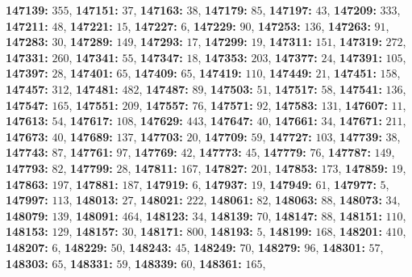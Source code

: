 \textsf{\bfseries 147139:} $355$, \textsf{\bfseries 147151:} $37$, \textsf{\bfseries 147163:} $38$, \textsf{\bfseries 147179:} $85$, \textsf{\bfseries 147197:} $43$, \textsf{\bfseries 147209:} $333$, \textsf{\bfseries 147211:} $48$, \textsf{\bfseries 147221:} $15$, \textsf{\bfseries 147227:} $6$, \textsf{\bfseries 147229:} $90$, \textsf{\bfseries 147253:} $136$, \textsf{\bfseries 147263:} $91$, \textsf{\bfseries 147283:} $30$, \textsf{\bfseries 147289:} $149$, \textsf{\bfseries 147293:} $17$, \textsf{\bfseries 147299:} $19$, \textsf{\bfseries 147311:} $151$, \textsf{\bfseries 147319:} $272$, \textsf{\bfseries 147331:} $260$, \textsf{\bfseries 147341:} $55$, \textsf{\bfseries 147347:} $18$, \textsf{\bfseries 147353:} $203$, \textsf{\bfseries 147377:} $24$, \textsf{\bfseries 147391:} $105$, \textsf{\bfseries 147397:} $28$, \textsf{\bfseries 147401:} $65$, \textsf{\bfseries 147409:} $65$, \textsf{\bfseries 147419:} $110$, \textsf{\bfseries 147449:} $21$, \textsf{\bfseries 147451:} $158$, \textsf{\bfseries 147457:} $312$, \textsf{\bfseries 147481:} $482$, \textsf{\bfseries 147487:} $89$, \textsf{\bfseries 147503:} $51$, \textsf{\bfseries 147517:} $58$, \textsf{\bfseries 147541:} $136$, \textsf{\bfseries 147547:} $165$, \textsf{\bfseries 147551:} $209$, \textsf{\bfseries 147557:} $76$, \textsf{\bfseries 147571:} $92$, \textsf{\bfseries 147583:} $131$, \textsf{\bfseries 147607:} $11$, \textsf{\bfseries 147613:} $54$, \textsf{\bfseries 147617:} $108$, \textsf{\bfseries 147629:} $443$, \textsf{\bfseries 147647:} $40$, \textsf{\bfseries 147661:} $34$, \textsf{\bfseries 147671:} $211$, \textsf{\bfseries 147673:} $40$, \textsf{\bfseries 147689:} $137$, \textsf{\bfseries 147703:} $20$, \textsf{\bfseries 147709:} $59$, \textsf{\bfseries 147727:} $103$, \textsf{\bfseries 147739:} $38$, \textsf{\bfseries 147743:} $87$, \textsf{\bfseries 147761:} $97$, \textsf{\bfseries 147769:} $42$, \textsf{\bfseries 147773:} $45$, \textsf{\bfseries 147779:} $76$, \textsf{\bfseries 147787:} $149$, \textsf{\bfseries 147793:} $82$, \textsf{\bfseries 147799:} $28$, \textsf{\bfseries 147811:} $167$, \textsf{\bfseries 147827:} $201$, \textsf{\bfseries 147853:} $173$, \textsf{\bfseries 147859:} $19$, \textsf{\bfseries 147863:} $197$, \textsf{\bfseries 147881:} $187$, \textsf{\bfseries 147919:} $6$, \textsf{\bfseries 147937:} $19$, \textsf{\bfseries 147949:} $61$, \textsf{\bfseries 147977:} $5$, \textsf{\bfseries 147997:} $113$, \textsf{\bfseries 148013:} $27$, \textsf{\bfseries 148021:} $222$, \textsf{\bfseries 148061:} $82$, \textsf{\bfseries 148063:} $88$, \textsf{\bfseries 148073:} $34$, \textsf{\bfseries 148079:} $139$, \textsf{\bfseries 148091:} $464$, \textsf{\bfseries 148123:} $34$, \textsf{\bfseries 148139:} $70$, \textsf{\bfseries 148147:} $88$, \textsf{\bfseries 148151:} $110$, \textsf{\bfseries 148153:} $129$, \textsf{\bfseries 148157:} $30$, \textsf{\bfseries 148171:} $800$, \textsf{\bfseries 148193:} $5$, \textsf{\bfseries 148199:} $168$, \textsf{\bfseries 148201:} $410$, \textsf{\bfseries 148207:} $6$, \textsf{\bfseries 148229:} $50$, \textsf{\bfseries 148243:} $45$, \textsf{\bfseries 148249:} $70$, \textsf{\bfseries 148279:} $96$, \textsf{\bfseries 148301:} $57$, \textsf{\bfseries 148303:} $65$, \textsf{\bfseries 148331:} $59$, \textsf{\bfseries 148339:} $60$, \textsf{\bfseries 148361:} $165$, 

